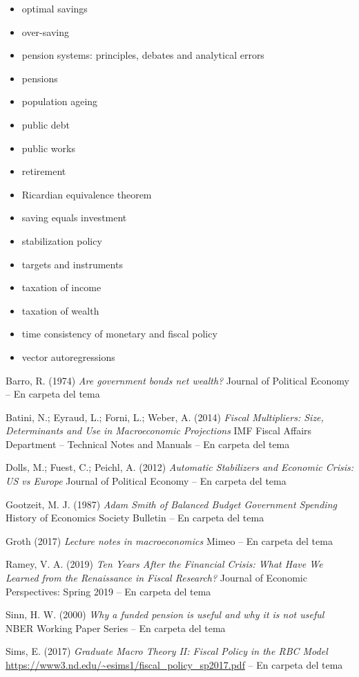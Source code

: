 \documentclass{nuevotema}
\begin{document}
\begin{itemize}
	\item optimal savings
	\item over-saving
	\item pension systems: principles, debates and analytical errors
	\item pensions
	\item population ageing
	\item public debt
	\item public works
	\item retirement
	\item Ricardian equivalence theorem
	\item saving equals investment
	\item stabilization policy
	\item targets and instruments
	\item taxation of income
	\item taxation of wealth
	\item time consistency of monetary and fiscal policy
	\item vector autoregressions
\end{itemize}

Barro, R. (1974) \textit{Are government bonds net wealth?} Journal of Political Economy -- En carpeta del tema

Batini, N.; Eyraud, L.; Forni, L.; Weber, A. (2014) \textit{Fiscal Multipliers: Size, Determinants and Use in Macroeconomic Projections} IMF Fiscal Affairs Department -- Technical Notes and Manuals -- En carpeta del tema

Dolls, M.; Fuest, C.; Peichl, A. (2012) \textit{Automatic Stabilizers and Economic Crisis: US vs Europe} Journal of Political Economy -- En carpeta del tema

Gootzeit, M. J. (1987) \textit{Adam Smith of Balanced Budget Government Spending} History of Economics Society Bulletin -- En carpeta del tema

Groth (2017) \textit{Lecture notes in macroeconomics} Mimeo -- En carpeta del tema

Ramey, V. A. (2019) \textit{Ten Years After the Financial Crisis: What Have We Learned from the Renaissance in Fiscal Research?} Journal of Economic Perspectives: Spring 2019 -- En carpeta del tema

Sinn, H. W. (2000) \textit{Why a funded pension is useful and why it is not useful} NBER Working Paper Series -- En carpeta del tema

Sims, E. (2017) \textit{Graduate Macro Theory II: Fiscal Policy in the RBC Model} \url{https://www3.nd.edu/~esims1/fiscal_policy_sp2017.pdf} -- En carpeta del tema
\end{document}
